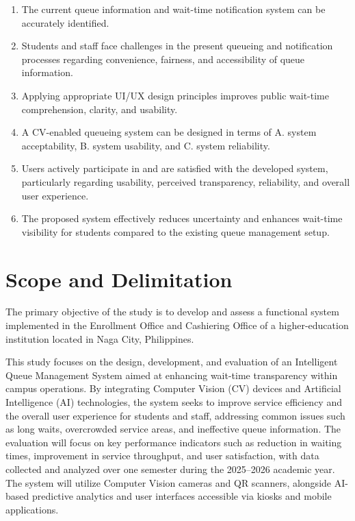 \documentclass{research}
\begin{document}
\begin{enumerate}

    \item The current queue information and wait-time notification system can be accurately identified.

    \item Students and staff face challenges in the present queueing and notification processes regarding convenience, fairness, and accessibility of queue information.

    \item Applying appropriate UI/UX design principles improves public wait-time comprehension, clarity, and usability.

    \item A CV-enabled queueing system can be designed in terms of A. system acceptability, B. system usability, and C. system reliability.
    
    \item Users actively participate in and are satisfied with the developed system, particularly regarding usability, perceived transparency, reliability, and overall user experience.
    
    \item The proposed system effectively reduces uncertainty and enhances wait-time visibility for students compared to the existing queue management setup.  

\end{enumerate}

\section{Scope and Delimitation}

The primary objective of the study is to develop and assess a functional system implemented in the Enrollment Office and Cashiering Office of a higher-education institution located in Naga City, Philippines.

This study focuses on the design, development, and evaluation of an Intelligent Queue Management System aimed at enhancing wait-time transparency within campus operations. By integrating Computer Vision (CV) devices and Artificial Intelligence (AI) technologies, the system seeks to improve service efficiency and the overall user experience for students and staff, addressing common issues such as long waits, overcrowded service areas, and ineffective queue information. The evaluation will focus on key performance indicators such as reduction in waiting times, improvement in service throughput, and user satisfaction, with data collected and analyzed over one semester during the 2025--2026 academic year. The system will utilize Computer Vision cameras and QR scanners, alongside AI-based predictive analytics and user interfaces accessible via kiosks and mobile applications.
\end{document}
